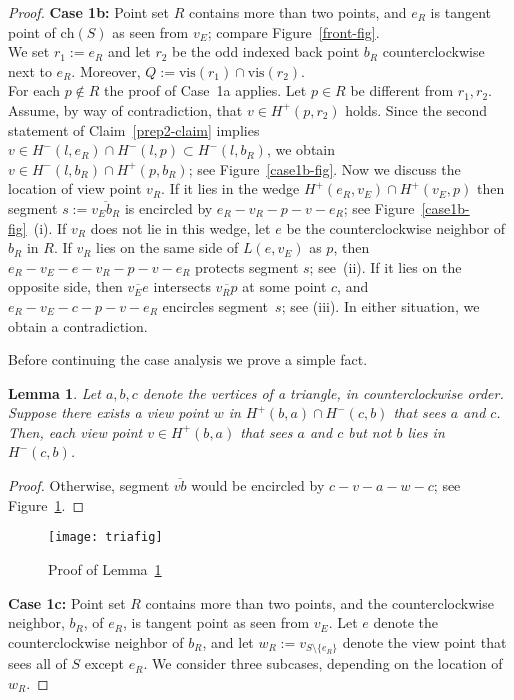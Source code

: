 \documentclass[11pt]{article}
\newtheorem{lemma}{Lemma}
\begin{document}
\begin{proof}
{\bf Case 1b:} Point set $R$ contains more than two points, and $e_R$ is tangent point of $\mbox{ch}(S)$
as seen from $v_E$; compare Figure~\ref{front-fig}.\\
We set $r_1:=e_R$ and let $r_2$ be the odd indexed back point $b_R$ counterclockwise next to $e_R$.
Moreover, $Q:=  \mbox{vis}(r_1) \cap \mbox{vis}(r_2)$.\\
For each $p \notin R$ the proof of Case~1a applies. Let $p \in R$ be different from $r_1, r_2$.
Assume, by way of contradiction, that $v\in H^+(p,r_2)$ holds. Since the second statement of 
Claim~\ref{prep2-claim} implies
$v \in H^-(l,e_R) \cap H^-(l,p) \subset H^-(l,b_R)$, we obtain $v \in H^-(l,b_R) \cap H^+(p,b_R)$;
see Figure~\ref{case1b-fig}.
Now we discuss the location of view point $v_R$. If it lies in the wedge $H^+(e_R, v_E) \cap H^+(v_E,p)$ 
then segment $s:=\overline{v_Eb_R}$ is encircled by $e_R-v_R-p-v-e_R$; see Figure~\ref{case1b-fig}~(i).
If $v_R$ does not lie in this wedge, let $e$ be the counterclockwise neighbor of $b_R$ in $R$.
If $v_R$ lies on the same side of $L(e,v_E)$ as $p$, then 
$e_R-v_E-e-v_R-p-v-e_R$ protects segment $s$; see~(ii).
If it lies on the opposite side, then $\overline{v_Ee}$ intersects  $\overline{v_Rp}$
at some point $c$, and $e_R-v_E-c-p-v-e_R$ encircles segment~$s$; see (iii).
In either situation, we obtain a contradiction.

Before continuing the case analysis we prove a simple fact.
\begin{lemma}          \label{tria-lem}
Let $a,b,c$ denote the vertices of a triangle, in counterclockwise order. Suppose there exists 
a view point $w$ in $H^+(b,a) \cap H^-(c,b)$ that sees $a$ and $c$. Then,
each view point $v \in H^+(b,a)$ that sees $a$ and $c$ but not $b$ lies in $H^-(c,b)$.
\end{lemma}
\begin{proof}
Otherwise, segment $\overline{vb}$ would be encircled by $c-v-a-w-c$; see Figure~\ref{tria-fig}.
\end{proof}
\begin{figure}[hbtp]\begin{center}\texttt{[image: triafig]}\caption{Proof of Lemma~\ref{tria-lem}}\label{tria-fig}
  \end{center}\end{figure}
{\bf Case 1c:} Point set $R$ contains more than two points, and the 
counterclockwise neighbor, $b_R$, of $e_R$, is tangent point as seen from $v_E$.
Let $e$ denote the counterclockwise neighbor of $b_R$, and let $w_R := v_{S \setminus \{e_R\}}$
denote the view point that sees all of $S$ except $e_R$.
We consider three subcases, depending on the location of $w_R$.


\end{proof}
\end{document}
